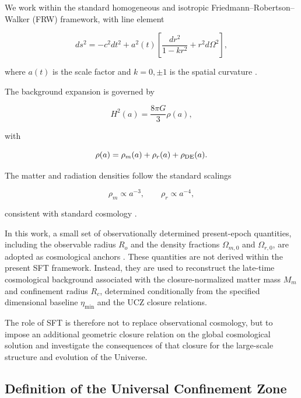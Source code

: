 \documentclass[12pt]{article}
\begin{document}
We work within the standard homogeneous and isotropic
Friedmann--Robertson--Walker (FRW) framework, with line element

\begin{equation}
ds^2 = -c^2dt^2 + a^2(t)\left[
\frac{dr^2}{1-kr^2}+r^2d\Omega^2
\right],
\end{equation}

where \(a(t)\) is the scale factor and \(k=0,\pm1\) is the spatial
curvature \cite{Carroll2001,Weinberg2008}.

The background expansion is governed by

\begin{equation}
H^2(a)=\frac{8\pi G}{3}\rho(a),
\label{eq:friedmann}
\end{equation}

with

\begin{equation}
\rho(a)=\rho_m(a)+\rho_r(a)+\rho_{\rm DE}(a).
\end{equation}

The matter and radiation densities follow the standard scalings

\[
\rho_m\propto a^{-3},
\qquad
\rho_r\propto a^{-4},
\]

consistent with standard cosmology
\cite{Carroll2001,Peebles2003,Weinberg2008}.

In this work, a small set of observationally determined present-epoch
quantities, including the observable radius \(R_o\) and the density
fractions \(\Omega_{m,0}\) and \(\Omega_{r,0}\), are adopted as
cosmological anchors
\cite{Planck2020,DESI2024,Alam2021}. These quantities are not derived
within the present SFT framework. Instead, they are used to reconstruct
the late-time cosmological background associated with the
closure-normalized matter mass \(M_m\) and confinement radius \(R_c\),
determined conditionally from the specified dimensional baseline
$\eta_{\min}$ and the UCZ closure relations.

The role of SFT is therefore not to replace observational cosmology,
but to impose an additional geometric closure relation on the global
cosmological solution and investigate the consequences of that closure
for the large-scale structure and evolution of the Universe.


\subsection{Definition of the Universal Confinement Zone}
\label{subsec:UCZ_definition}
\end{document}
